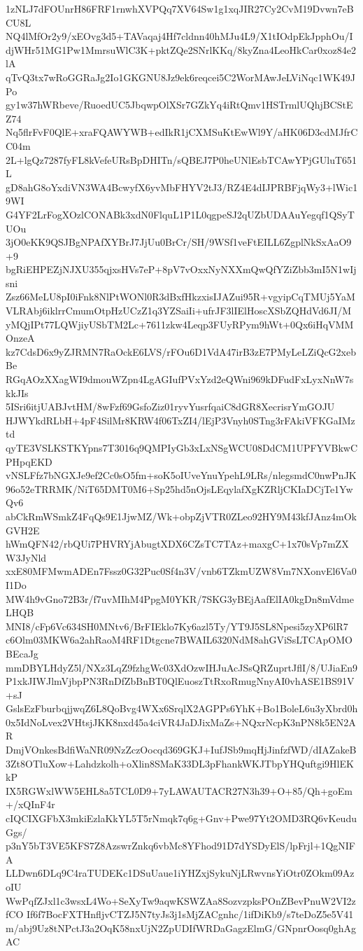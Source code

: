 1zNLJ7dFOUnrH86FRF1rnwhXVPQq7XV64Sw1g1xqJIR27Cy2CvM19Dvwn7eBCU8L
NQ4lMfOr2y9/xEOvg3d5+TAVaqaj4Hf7cldnn40hMJu4L9/X1tIOdpEkJpphOu/I
djWHr51MG1Pw1MmrsuWlC3K+pktZQe2SNrlKKq/8kyZna4LeoHkCar0xoz84e2lA
qTvQ3tx7wRoGGRaJg2Io1GKGNU8Jz9ek6reqcei5C2WorMAwJeLViNqc1WK49JPo
gy1w37hWRbeve/RuoedUC5JbqwpOlXSr7GZkYq4iRtQmv1HSTrmlUQhjBCStEZ74
Nq5flrFvF0QlE+xraFQAWYWB+edIkR1jCXMSuKtEwWl9Y/aHK06D3cdMJfrCC04m
2L+lgQz7287fyFL8kVefeURsBpDHITn/sQBEJ7P0heUNlEsbTCAwYPjGUluT651L
gD8ahG8oYxdiVN3WA4BcwyfX6yvMbFHYV2tJ3/RZ4E4dIJPRBFjqWy3+lWic19WI
G4YF2LrFogXOzlCONABk3xdN0FlquL1P1L0qgpeSJ2qUZbUDAAuYegqf1QSyTUOu
3jO0eKK9QSJBgNPAfXYBrJ7JjUu0BrCr/SH/9WSf1veFtEILL6ZgplNkSxAaO9+9
bgRiEHPEZjNJXU355qjxsHVs7eP+8pV7vOxxNyNXXmQwQfYZiZbb3mI5N1wIjsni
Zsz66MeLU8pI0iFnk8NlPtWONl0R3dBxfHkzxisIJAZui95R+vgyipCqTMUj5YaM
VLRAbj6iklrrCmumOtpHzUCzZ1q3YZSaiIi+ufrJF3lIElHoscXSbZQHdVd6JI/M
yMQjIPt77LQWjiyUSbTM2Lc+7611zkw4Leqp3FUyRPym9hWt+0Qx6iHqVMMOnzeA
kz7CdsD6x9yZJRMN7RaOckE6LVS/rFOu6D1VdA47irB3zE7PMyLeLZiQcG2xebBe
RGqAOzXXagWI9dmouWZpn4LgAGIufPVxYzd2eQWni969kDFudFxLyxNnW7skkJIs
5ISri6itjUABJvtHM/8wFzf69GsfoZiz01ryvYusrfqaiC8dGR8XecrisrYmGOJU
HJWYkdRLbH+4pF4SilMr8KRW4f06TxZI4/lEjP3Vnyh0STng3rFAkiVFKGaIMztd
qyTE3VSLKSTKYpns7T3016q9QMPIyGb3xLxNSgWCU08DdCM1UPFYVBkwCPHpqEKD
vNSLFfz7bNGXJe9ef2Cc0sO5fm+soK5oIUveYnuYpehL9LRs/nlegsmdC0nwPnJK
96o52eTRRMK/NiT65DMT0M6+Sp25hd5nOjsLEqylafXgKZRljCKIaDCjTe1YwQv6
abCkRmWSmkZ4FqQs9E1JjwMZ/Wk+obpZjVTR0ZLeo92HY9M43kfJAnz4mOkGVH2E
hWmQFN42/rbQUi7PHVRYjAbugtXDX6CZsTC7TAz+maxgC+1x70sVp7mZXW3JyNld
xxE80MFMwmADEn7Fssz0G32Puc0Sf4n3V/vnb6TZkmUZW8Vm7NXonvEl6Va0I1Do
MW4h9vGno72B3r/f7uvMIhM4PpgM0YKR/7SKG3yBEjAafElIA0kgDn8mVdmeLHQB
MNI8/cFp6Vc634SH0MNtv6/BrFIEklo7Ky6azl5Ty/YT9J5SL8Npesi5zyXP6lR7
c6Olm03MKW6a2ahRaoM4RF1Dtgcne7BWAIL6320NdM8ahGViSsLTCApOMOBEcaJg
mmDBYLHdyZ5l/NXz3LqZ9fzhgWc03XdOzwIHJuAcJSsQRZuprtJflI/8/UJiaEn9
P1xkJIWJlmVjbpPN3RnDfZbBnBT0QlEuoszTtRxoRmugNnyAI0vhASE1BS91V+sJ
GslsEzFburbqjjwqZ6L8QoBvg4WXx6SrqlX2AGPPs6YhK+Bo1BoleL6u3yXbrd0h
0x5IdNoLvex2VHtsjJKK8nxd45a4ciVR4JaDJixMaZs+NQxrNcpK3nPN8k5EN2AR
DmjVOnkesBdfiWaNR09NzZczOocqd369GKJ+IufJSb9mqHjJinfzfWD/dIAZakeB
3Zt8OTluXow+Lahdzkolh+oXlin8SMaK33DL3pFhankWKJTbpYHQuftgi9HlEKkP
IX5RGWxlWW5EHL8a5TCL0D9+7yLAWAUTACR27N3h39+O+85/Qh+goEm+/xQInF4r
cIQCIXGFbX3mkiEzlaKkYL5T5rNmqk7q6g+Gnv+Pwe97Yt2OMD3RQ6vKeuduGgs/
p3nY5bT3VE5KFS7Z8AzswrZnkq6vbMc8YFhod91D7dYSDyElS/lpFrjl+1QgNIFA
LLDwn6DLq9C4raTUDEKc1DSuUaue1iYHZxjSykuNjLRwvnsYiOtr0ZOkm09AzoIU
WwPqfZJxl1c3wsxL4Wo+SeXyTw9aqwKSWZAa8SozvzpksPOnZBevPnuW2VI2zfCO
If6f7BocFXTHnfljvCTZJ5N7tyJs3j1sMjZACgnhc/1ifDiKb9/s7teDoZ5e5V41
m/abj9Uz8tNPctJ3a2OqK58nxUjN2ZpUDIfWRDaGagzElmG/GNpnrOosq0ghAgAC
